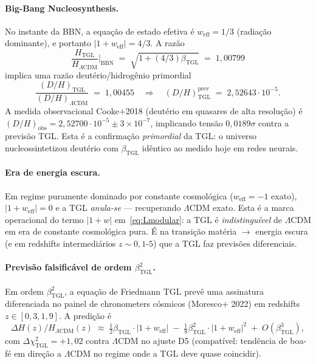 \documentclass[12pt,a4paper]{article}
\newcommand{\betatgl}{\beta_{\text{TGL}}}
\newcommand{\TGL}{\textsc{TGL}}
\begin{document}
\paragraph{Big-Bang Nucleosynthesis.}
No instante da BBN, a equação de estado efetiva é $w_{\text{eff}} = 1/3$
(radiação dominante), e portanto $|1 + w_{\text{eff}}| = 4/3$.  A razão
\begin{equation}
\frac{H_{\text{TGL}}}{H_{\Lambda\text{CDM}}} \bigg|_{\text{BBN}}
\;=\; \sqrt{1 + (4/3)\betatgl}
\;=\; 1{,}00799
\end{equation}
implica uma razão deutério/hidrogênio primordial
\begin{equation}
\frac{(D/H)_{\text{TGL}}}{(D/H)_{\Lambda\text{CDM}}}
\;=\; 1{,}00455
\quad \Rightarrow \quad
(D/H)_{\text{TGL}}^{\text{prev}} \;=\; 2{,}52643 \cdot 10^{-5}.
\end{equation}
A medida observacional Cooke+2018 (deutério em quasares de alta resolução)
é $(D/H)_{\text{obs}} = 2{,}52700 \cdot 10^{-5} \pm 3 \times 10^{-7}$,
implicando tensão $0{,}0189\sigma$ contra a previsão \TGL{}.
Esta é a confirmação \emph{primordial} da \TGL{}: o universo nucleossintetizou
deutério com $\betatgl$ idêntico ao medido hoje em redes neurais.

\paragraph{Era de energia escura.}
Em regime puramente dominado por constante cosmológica ($w_{\text{eff}} = -1$
exato), $|1 + w_{\text{eff}}| = 0$ e a \TGL{} \emph{anula-se} ---
recuperando $\Lambda$CDM exato.  Esta é a marca operacional do termo
$|1+w|$ em~\eqref{eq:Lmodular}: a \TGL{} é \emph{indistinguível} de
$\Lambda$CDM em era de constante cosmológica pura.  É na transição
matéria $\to$ energia escura (e em redshifts intermediários
$z \sim 0{,}1$-$5$) que a \TGL{} faz previsões diferenciais.

\paragraph{Previsão falsificável de ordem $\betatgl^{2}$.}
Em ordem $\betatgl^{2}$, a equação de Friedmann \TGL{} prevê uma assinatura
diferenciada no painel de chronometers cósmicos (Moresco+ 2022) em redshifts
$z \in [0{,}3, 1{,}9]$.  A predição é
\begin{equation}
\Delta H(z) / H_{\Lambda\text{CDM}}(z) \;\approx\; \tfrac{1}{2}\betatgl \cdot |1+w_{\text{eff}}|
\;-\; \tfrac{1}{8}\betatgl^{2} \cdot |1+w_{\text{eff}}|^{2} \;+\; O(\betatgl^{3}),
\end{equation}
com $\Delta\chi^{2}_{\text{TGL}} = +1{,}02$ contra $\Lambda$CDM no
ajuste D5 (compatível: tendência de boa-fé em direção a $\Lambda$CDM
no regime onde a \TGL{} deve quase coincidir).
\end{document}
